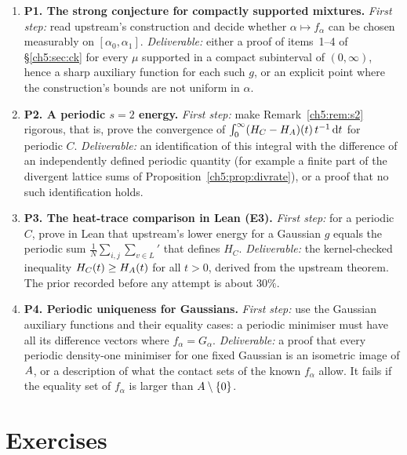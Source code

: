 \begin{enumerate}[leftmargin=*,label=\textbf{\arabic*.}]
  \S\ref{ch5:sec:div} (triangular against literature, square-lattice saddle). \emph{Deliverable:} the same relaxation
  test (no periodic configuration below triangular) at $s=1/2$ or $s=3/2$, preregistered, with the outcome reported
  whatever it is.
\item \textbf{P1. The strong conjecture for compactly supported mixtures.} \emph{First step:} read upstream's
  construction and decide whether $\alpha\mapsto f_\alpha$ can be chosen measurably on $[\alpha_0,\alpha_1]$.
  \emph{Deliverable:} either a proof of items~1--4 of \S\ref{ch5:sec:ck} for every $\mu$ supported in a compact
  subinterval of $(0,\infty)$, hence a sharp auxiliary function for each such $g$, or an explicit point where the
  construction's bounds are not uniform in $\alpha$.
\item \textbf{P2. A periodic $s=2$ energy.} \emph{First step:} make Remark~\ref{ch5:rem:s2} rigorous, that is, prove the
  convergence of $\int_0^\infty(H_C-H_A)(t)\,t^{-1}\,\mathrm{d}t$ for periodic $C$. \emph{Deliverable:} an
  identification of this integral with the difference of an independently defined periodic quantity (for example a
  finite part of the divergent lattice sums of Proposition~\ref{ch5:prop:divrate}), or a proof that no such
  identification holds.
\item \textbf{P3. The heat-trace comparison in Lean (E3).} \emph{First step:} for a periodic $C$, prove in Lean that
  upstream's lower energy  for a Gaussian $g$ equals the periodic sum $\frac1N\sum_{i,j}\sum_{v\in L}'$
  that defines $H_C$. \emph{Deliverable:} the kernel-checked inequality $H_C(t)\ge H_A(t)$ for all $t>0$, derived
  from the upstream theorem. The prior recorded before any attempt is about $30\%$.
\item \textbf{P4. Periodic uniqueness for Gaussians.} \emph{First step:} use the Gaussian auxiliary functions and
  their equality cases: a periodic minimiser must have all its difference vectors where $f_\alpha=G_\alpha$.
  \emph{Deliverable:} a proof that every periodic density-one minimiser for one fixed Gaussian is an isometric image
  of $A$, or a description of what the contact sets of the known $f_\alpha$ allow. It fails if the equality set of
  $f_\alpha$ is larger than $A\setminus\{0\}$.
\end{enumerate}

\section*{Exercises}

